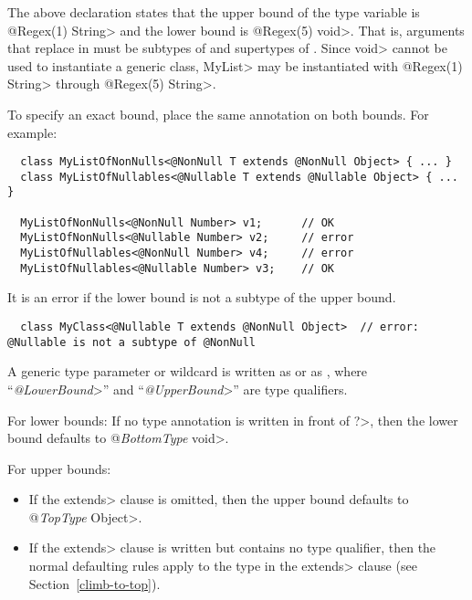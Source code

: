 The above declaration states that the upper bound of the type variable
is \<@Regex(1) String> and the lower bound is \<@Regex(5) void>.  That is,
arguments that replace  in  must be subtypes of
 and supertypes of .
Since \<void> cannot be used to instantiate a generic class, \<MyList> may
be instantiated with \<@Regex(1) String> through \<@Regex(5) String>.


To specify an exact bound, place the same annotation on both bounds.  For example:

\begin{Verbatim}
  class MyListOfNonNulls<@NonNull T extends @NonNull Object> { ... }
  class MyListOfNullables<@Nullable T extends @Nullable Object> { ... }

  MyListOfNonNulls<@NonNull Number> v1;      // OK
  MyListOfNonNulls<@Nullable Number> v2;     // error
  MyListOfNullables<@NonNull Number> v4;     // error
  MyListOfNullables<@Nullable Number> v3;    // OK
\end{Verbatim}

It is an error if the lower bound is not a subtype of the upper bound.

\begin{smaller}
\begin{Verbatim}
  class MyClass<@Nullable T extends @NonNull Object>  // error: @Nullable is not a subtype of @NonNull
\end{Verbatim}
\end{smaller}



A generic type parameter or wildcard is written as  or as
, where
``\<\emph{@LowerBound}>'' and ``\<\emph{@UpperBound}>'' are type qualifiers.

For lower bounds:
If no type annotation is written in front of \<?>,
then the lower bound defaults to \<@\emph{BottomType} void>.

For upper bounds:
\begin{itemize}
\item
If the \<extends> clause is omitted,
then the upper bound defaults to \<@\emph{TopType} Object>.
\item
If the \<extends> clause is written but contains no type qualifier,
then the normal defaulting rules apply to the type in the \<extends>
clause (see Section~\ref{climb-to-top}).
\end{itemize}

